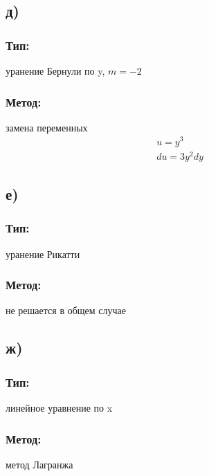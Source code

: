 \documentclass{article}
\begin{document}
\subsection*{д)}
\subsubsection*{Тип:} 
уранение Бернули по y, $m=-2$

\subsubsection*{Метод:}
замена переменных
\begin{gather*}
    u=y^3\\
    du=3y^2dy
\end{gather*}

\subsection*{е)}
\subsubsection*{Тип:} 
уранение Рикатти

\subsubsection*{Метод:}
не решается в общем случае

\subsection*{ж)}
\subsubsection*{Тип:} 
линейное уравнение по x

\subsubsection*{Метод:}
метод Лагранжа
\end{document}
